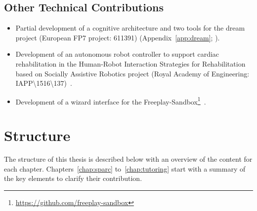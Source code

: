 \subsection{Other Technical Contributions}
\begin{itemize}
	\item Partial development of a cognitive architecture and two tools for the \acrshort{dream} project (European FP7 project: 611391) (Appendix~\ref{app:dream}; \citealt{esteban2017build}).
	\item Development of an autonomous robot controller to support cardiac rehabilitation in the Human-Robot Interaction Strategies for Rehabilitation based on Socially Assistive Robotics project (Royal Academy of Engineering: IAPP\textbackslash1516\textbackslash137)~\citep{lara2017human,casas2018social}.
	\item Development of a wizard interface for the Freeplay-Sandbox\footnote{\url{https://github.com/freeplay-sandbox}}~\citep{lemaignan2017free,wallbridge2018spatial}.
\end{itemize}
	
\section{Structure}\label{sec:intro_struct}

The structure of this thesis is described below with an overview of the content for each chapter. Chapters~\ref{chap:sparc} to~\ref{chap:tutoring} start with a summary of the key elements to clarify their contribution.

